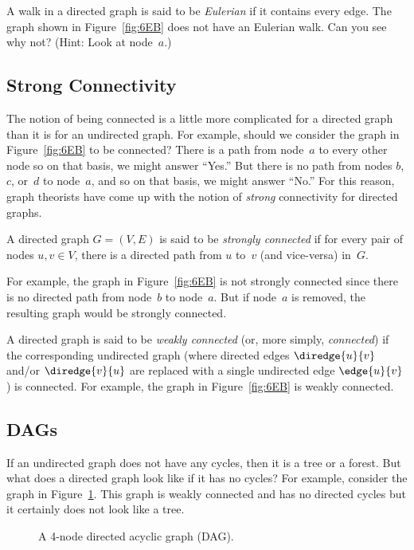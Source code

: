 A walk in a directed graph is said to be \emph{Eulerian} if it
contains every edge.  The graph shown in Figure~\ref{fig:6EB} does not
have an Eulerian walk.  Can you see why not?  (Hint: Look at
node~$a$.)

\subsection{Strong Connectivity}

The notion of being connected is a little more complicated for a
directed graph than it is for an undirected graph.  For example,
should we consider the graph in Figure~\ref{fig:6EB} to be connected?
There is a path from node~$a$ to every other node so on that basis, we
might answer ``Yes.''  But there is no path from nodes $b$, $c$,
or~$d$ to node~$a$, and so on that basis, we might answer ``No.''  For
this reason, graph theorists have come up with the notion of
\emph{strong} connectivity for directed graphs.

\begin{definition}
A directed graph $G = (V, E)$ is said to be \emph{strongly connected}
if for every pair of nodes $u, v \in V$, there is a directed path from
$u$ to~$v$ (and vice-versa) in~$G$.
\end{definition}

For example, the graph in Figure~\ref{fig:6EB} is not strongly
connected since there is no directed path from node~$b$ to node~$a$.
But if node~$a$ is removed, the resulting graph would be strongly
connected.

A directed graph is said to be \emph{weakly connected} (or, more
simply, \emph{connected}) if the corresponding undirected graph (where
directed edges $\diredge{u}{v}$ and/or $\diredge{v}{u}$ are replaced
with a single undirected edge $\edge{u}{v}$) is connected.  For example,
the graph in Figure~\ref{fig:6EB} is weakly connected.

\subsection{DAGs}

If an undirected graph does not have any cycles, then it is a tree or
a forest.  But what does a directed graph look like if it has no
cycles?  For example, consider the graph in Figure~\ref{fig:6ED}.
This graph is weakly connected and has no directed cycles but it
certainly does not look like a tree.

\begin{figure}


\caption{A 4-node directed acyclic graph (DAG).}

\label{fig:6ED}

\end{figure}

